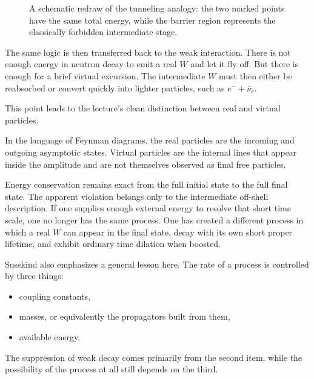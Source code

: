 \begin{figure}[htbp]
\centering
{}
\caption{A schematic redraw of the tunneling analogy: the two marked points have the same total energy, while the barrier region represents the classically forbidden intermediate stage.}
\end{figure}

The same logic is then transferred back to the weak interaction. There is not enough energy in neutron decay to emit a real \(W\) and let it fly off. But there is enough for a brief virtual excursion. The intermediate \(W\) must then either be reabsorbed or convert quickly into lighter particles, such as \(e^-+\bar{\nu}_e\).

This point leads to the lecture's clean distinction between real and virtual particles.

\begin{definition}
In the language of Feynman diagrams, the real particles are the incoming and outgoing asymptotic states. Virtual particles are the internal lines that appear inside the amplitude and are not themselves observed as final free particles.
\end{definition}

Energy conservation remains exact from the full initial state to the full final state. The apparent violation belongs only to the intermediate off-shell description. If one supplies enough external energy to resolve that short time scale, one no longer has the same process. One has created a different process in which a real \(W\) can appear in the final state, decay with its own short proper lifetime, and exhibit ordinary time dilation when boosted.

Susskind also emphasizes a general lesson here. The rate of a process is controlled by three things:
\begin{itemize}
\item coupling constants,
\item masses, or equivalently the propagators built from them,
\item available energy.
\end{itemize}
The suppression of weak decay comes primarily from the second item, while the possibility of the process at all still depends on the third.

